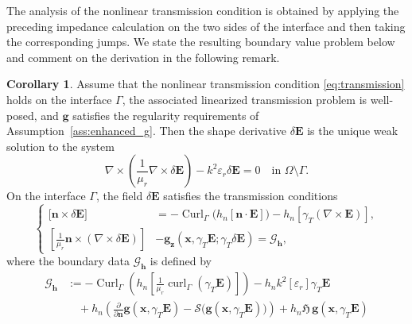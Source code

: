 \documentclass[12pt,reqno]{amsart}
\theoremstyle{definition}
\newtheorem{coro}[theo]{Corollary}
\numberwithin{equation}{section}
\begin{document}
The analysis of the nonlinear transmission condition is obtained by applying
the preceding impedance calculation on the two sides of the interface and
then taking the corresponding jumps. We state the resulting boundary value
problem below and comment on the derivation in the following remark.

\begin{coro}\label{th:shape_derivative_transmission}
Assume that the nonlinear transmission condition \eqref{eq:transmission} holds on the interface \(\Gamma\), the associated linearized transmission problem is well-posed, and $\mathbf{g}$ satisfies the regularity requirements of Assumption~\ref{ass:enhanced_g}. Then the shape derivative $\delta\mathbf{E}$ is the unique weak solution to the system
\begin{equation}
\label{eq:shape_transmission_volume}
\nabla \times \left( \frac{1}{\mu_r} \nabla \times \delta\mathbf{E} \right) - k^2 \varepsilon_r \delta\mathbf{E} = 0 \quad \text{in } \Omega \setminus \Gamma.
\end{equation}
On the interface $\Gamma$, the field $\delta\mathbf{E}$ satisfies the transmission conditions
\begin{equation}
\label{eq:shape_transmission_conditions}
\left\{
\begin{aligned}
\bigl[ \mathbf{n} \times \delta\mathbf{E} \bigr] &= -\operatorname{Curl}_\Gamma \bigl( h_n [ \mathbf{n} \cdot \mathbf{E} ] \bigr) - h_n [ \gamma_T (\nabla \times \mathbf{E}) ], \\[5pt]
\left[ \frac{1}{\mu_r} \mathbf{n} \times (\nabla \times \delta\mathbf{E}) \right] &- \mathbf{g}_{\boldsymbol{z}}(\boldsymbol{x}, \gamma_T \mathbf{E}; \gamma_T \delta\mathbf{E}) = \mathcal{G}_{\mathbf{h}},
\end{aligned}
\right.
\end{equation}
where the boundary data $\mathcal{G}_{\mathbf{h}}$ is defined by
\begin{equation}
\label{eq:shape_transmission_rhs}
\begin{aligned}
\mathcal{G}_{\mathbf{h}} &:= -\operatorname{Curl}_\Gamma \left( h_n \left[ \frac{1}{\mu_r} \operatorname{curl}_\Gamma(\gamma_T\mathbf{E}) \right] \right) - h_n k^2 [\varepsilon_r] \gamma_T \mathbf{E} \\
&\quad + h_n \left( \frac{\partial}{\partial \mathbf{n}} \mathbf{g}(\boldsymbol{x}, \gamma_T \mathbf{E}) - \mathcal{S} \bigl( \mathbf{g}(\boldsymbol{x}, \gamma_T \mathbf{E}) \bigr) \right) + h_n \mathfrak{H} \, \mathbf{g}(\boldsymbol{x}, \gamma_T \mathbf{E}) \\

\end{aligned}
\end{equation}
\end{coro}
\end{document}

